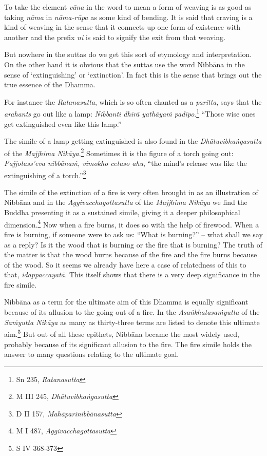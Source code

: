 To take the element \emph{vāna} in the word to mean a form of weaving is as good as taking \emph{nāma} in \emph{nāma-rūpa} as some kind of bending. It is said that craving is a kind of weaving in the sense that it connects up one form of existence with another and the prefix \emph{ni} is said to signify the exit from that weaving.

But nowhere in the suttas do we get this sort of etymology and interpretation. On the other hand it is obvious that the suttas use the word Nibbāna in the sense of `extinguishing' or `extinction'. In fact this is the sense that brings out the true essence of the Dhamma.

For instance the \emph{Ratanasutta}, which is so often chanted as a \emph{paritta}, says that the \emph{arahants} go out like a lamp: \emph{Nibbanti dhīrā yathāyaṁ padīpo}.\footnote{Sn 235, \emph{Ratanasutta}} ``Those wise ones get extinguished even like this lamp.''

The simile of a lamp getting extinguished is also found in the \emph{Dhātuvibhaṅgasutta} of the \emph{Majjhima Nikāya}.\footnote{M III 245, \emph{Dhātuvibhaṅgasutta}} Sometimes it is the figure of a torch going out: \emph{Pajjotass'eva nibbānaṁ, vimokho cetaso ahu}, ``the mind's release was like the extinguishing of a torch.''\footnote{D II 157, \emph{Mahāparinibbānasutta}}

The simile of the extinction of a fire is very often brought in as an illustration of Nibbāna and in the \emph{Aggivacchagottasutta} of the \emph{Majjhima Nikāya} we find the Buddha presenting it as a sustained simile, giving it a deeper philosophical dimension.\footnote{M I 487, \emph{Aggivacchagottasutta}} Now when a fire burns, it does so with the help of firewood. When a fire is burning, if someone were to ask us: ``What is burning?'' -- what shall we say as a reply? Is it the wood that is burning or the fire that is burning? The truth of the matter is that the wood burns because of the fire and the fire burns because of the wood. So it seems we already have here a case of relatedness of this to that, \emph{idappaccayatā.} This itself shows that there is a very deep significance in the fire simile.

Nibbāna as a term for the ultimate aim of this Dhamma is equally significant because of its allusion to the going out of a fire. In the \emph{Asaṅkhatasaṁyutta} of the \emph{Saṁyutta Nikāya} as many as thirty-three terms are listed to denote this ultimate aim.\footnote{S IV 368-373} But out of all these epithets, Nibbāna became the most widely used, probably because of its significant allusion to the fire. The fire simile holds the answer to many questions relating to the ultimate goal.


